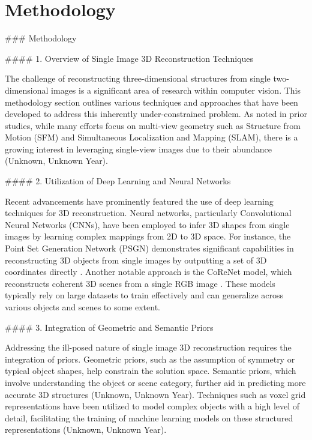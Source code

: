 \documentclass[conference]{IEEEtran}
\begin{document}
\section{Methodology}

### Methodology

#### 1. Overview of Single Image 3D Reconstruction Techniques

The challenge of reconstructing three-dimensional structures from single two-dimensional images is a significant area of research within computer vision. This methodology section outlines various techniques and approaches that have been developed to address this inherently under-constrained problem. As noted in prior studies, while many efforts focus on multi-view geometry such as Structure from Motion (SFM) and Simultaneous Localization and Mapping (SLAM), there is a growing interest in leveraging single-view images due to their abundance (Unknown, Unknown Year).

#### 2. Utilization of Deep Learning and Neural Networks

Recent advancements have prominently featured the use of deep learning techniques for 3D reconstruction. Neural networks, particularly Convolutional Neural Networks (CNNs), have been employed to infer 3D shapes from single images by learning complex mappings from 2D to 3D space. For instance, the Point Set Generation Network (PSGN) demonstrates significant capabilities in reconstructing 3D objects from single images by outputting a set of 3D coordinates directly \cite{fan2016}. Another notable approach is the CoReNet model, which reconstructs coherent 3D scenes from a single RGB image \cite{popov2020}. These models typically rely on large datasets to train effectively and can generalize across various objects and scenes to some extent.

#### 3. Integration of Geometric and Semantic Priors

Addressing the ill-posed nature of single image 3D reconstruction requires the integration of priors. Geometric priors, such as the assumption of symmetry or typical object shapes, help constrain the solution space. Semantic priors, which involve understanding the object or scene category, further aid in predicting more accurate 3D structures (Unknown, Unknown Year). Techniques such as voxel grid representations have been utilized to model complex objects with a high level of detail, facilitating the training of machine learning models on these structured representations (Unknown, Unknown Year).
\end{document}
